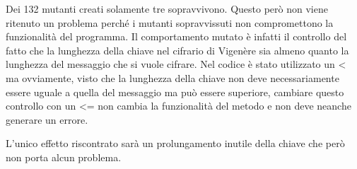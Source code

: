 		Dei 132 mutanti creati solamente tre sopravvivono. Questo però non viene ritenuto un problema perché i mutanti sopravvissuti non compromettono la funzionalità del programma. Il comportamento mutato è infatti il controllo del fatto che la lunghezza della chiave nel cifrario di Vigenère sia almeno quanto la lunghezza del messaggio che si vuole cifrare. Nel codice è stato utilizzato un < ma ovviamente, visto che la lunghezza della chiave non deve necessariamente essere uguale a quella del messaggio ma può essere superiore, cambiare questo controllo con un <= non cambia la funzionalità del metodo e non deve neanche generare un errore.
		
		L'unico effetto riscontrato sarà un prolungamento inutile della chiave che però non porta alcun problema.
		